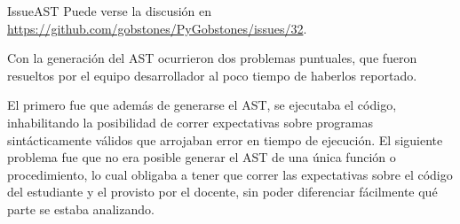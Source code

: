 \sepfootnotecontent
  {IssueAST}
  {Puede verse la discusión en \url{https://github.com/gobstones/PyGobstones/issues/32}.}

Con la generación del AST ocurrieron dos problemas puntuales, que fueron resueltos por el equipo desarrollador al poco tiempo de haberlos reportado.

El primero fue que además de generarse el AST, se ejecutaba el código, inhabilitando la posibilidad de correr expectativas sobre programas sintácticamente válidos que arrojaban error en tiempo de ejecución. El siguiente problema fue que no era posible generar el AST de una única función o procedimiento, lo cual obligaba a tener que correr las expectativas sobre el código del estudiante y el provisto por el docente, sin poder diferenciar fácilmente qué parte se estaba analizando.
